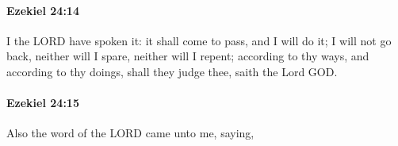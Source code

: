 		\paragraph{Ezekiel 24:14} %
			\label{EZEKIEL-24-14}

			I the LORD have spoken it: it shall come to pass, and I will do it; I will not go back, neither will I spare, neither will I repent; according to thy ways, and according to thy doings, shall they judge thee, saith the Lord GOD.


		\paragraph{Ezekiel 24:15} %
			\label{EZEKIEL-24-15}

			Also the word of the LORD came unto me, saying,


